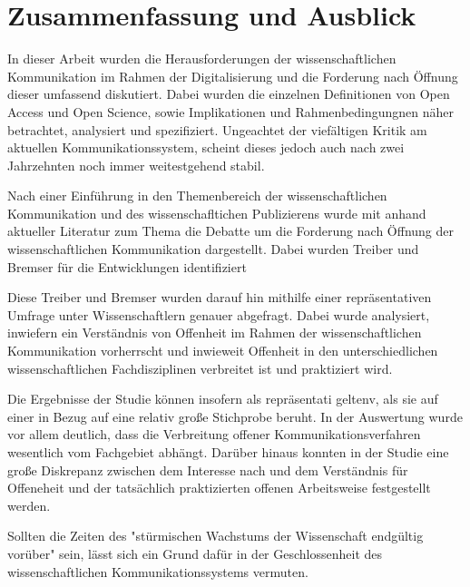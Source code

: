 \chapter{Zusammenfassung und Ausblick}

In dieser Arbeit wurden die Herausforderungen der wissenschaftlichen Kommunikation im Rahmen der Digitalisierung und die Forderung nach Öffnung dieser umfassend diskutiert. Dabei wurden die einzelnen Definitionen von Open Access und Open Science, sowie Implikationen und Rahmenbedingungnen näher betrachtet, analysiert und spezifiziert. Ungeachtet der viefältigen Kritik am aktuellen Kommunikationssystem, scheint dieses jedoch auch nach zwei Jahrzehnten noch immer weitestgehend stabil.

Nach einer Einführung in den Themenbereich der wissenschaftlichen Kommunikation und des wissenschafltichen Publizierens wurde mit anhand aktueller Literatur zum Thema die Debatte um die Forderung nach Öffnung der wissenschaftlichen Kommunikation dargestellt. Dabei wurden Treiber und Bremser für die Entwicklungen identifiziert 

Diese Treiber und Bremser wurden darauf hin mithilfe einer repräsentativen Umfrage unter Wissenschaftlern genauer abgefragt. Dabei wurde analysiert, inwiefern ein Verständnis von Offenheit im Rahmen der wissenschaftlichen Kommunikation vorherrscht und inwieweit Offenheit in den unterschiedlichen wissenschaftlichen Fachdisziplinen verbreitet ist und praktiziert wird.

Die Ergebnisse der Studie können insofern als repräsentati geltenv, als sie auf einer in Bezug auf eine relativ große Stichprobe beruht. In der Auswertung wurde vor allem deutlich, dass die Verbreitung offener Kommunikationsverfahren wesentlich vom Fachgebiet abhängt. Darüber hinaus konnten in der Studie eine große Diskrepanz zwischen dem Interesse nach und dem Verständnis für Offeneheit und der tatsächlich praktizierten offenen Arbeitsweise festgestellt werden.


Sollten die Zeiten des "stürmischen Wachstums der Wissenschaft endgültig vorüber" \cite{K_lbel_2002} sein, lässt sich ein Grund dafür in der Geschlossenheit des wissenschaftlichen Kommunikationssystems vermuten.
